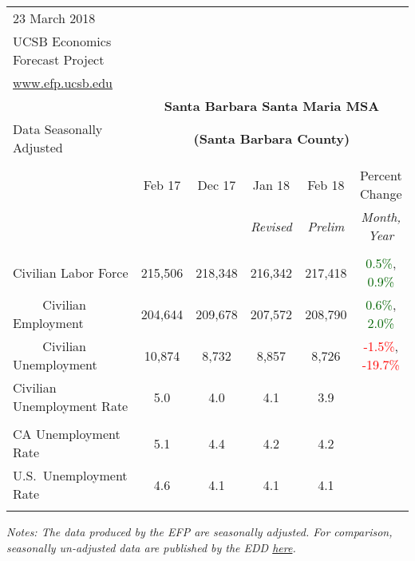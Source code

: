 \documentclass[12pt]{article}
\begin{document}
\begin{table}
\begin{tabular}{|l|c|c|c|c|c|}
\multicolumn{1}{l}{\small 23 March 2018} & \multicolumn{5}{c}{} \\
\multicolumn{1}{l}{\small UCSB Economics Forecast Project} & \multicolumn{5}{c}{} \\
\multicolumn{1}{l}{\small \href{http://www.efp.ucsb.edu/}{www.efp.ucsb.edu}} & \multicolumn{5}{c}{} \\
\multicolumn{1}{c}{} & \multicolumn{5}{c}{\large \textbf{Santa Barbara Santa Maria MSA}} \\
\multicolumn{1}{l}{\small Data Seasonally Adjusted} & \multicolumn{5}{c}{\small \textbf{(Santa Barbara County)}} \\ \hline \hline
& & & & & \\
 & Feb 17 & Dec 17 & Jan 18 & Feb 18 & Percent Change \\
 & & & \small \textit{Revised} & \small \textit{Prelim} & \small \textit{Month, Year} \\ \hline
& & & & & \\
Civilian Labor Force & 215,506 & 218,348 & 216,342 & 217,418 & \textcolor{darkgreen}{0.5\%}, \textcolor{darkgreen}{0.9\%} \\
$\qquad$ \small Civilian Employment & 204,644 & 209,678 & 207,572 & 208,790 & \textcolor{darkgreen}{0.6\%}, \textcolor{darkgreen}{2.0\%} \\
$\qquad$ \small Civilian Unemployment & 10,874 & 8,732 & 8,857 & 8,726 & \textcolor{red}{-1.5\%}, \textcolor{red}{-19.7\%} \\
Civilian Unemployment Rate & 5.0 & 4.0 & 4.1 & 3.9 & \\
& & & & & \\
CA Unemployment Rate & 5.1 & 4.4 & 4.2 & 4.2 & \\
U.S.\ Unemployment Rate & 4.6 & 4.1 & 4.1 & 4.1 & \\
& & & & & \\ \hline \hline
\end{tabular}
\par
\vspace{.5em}
\footnotesize
\textit{Notes: The data produced by the EFP are seasonally adjusted. For comparison, seasonally un-adjusted data are published by the EDD \href{http://www.labormarketinfo.ca.gov/file/lfmonth/satb$pds.pdf}{here}.}
\end{table}
\end{document}
